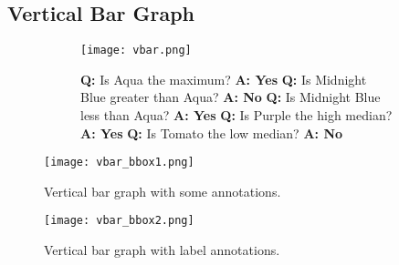 \documentclass{article} \usepackage{iclr2018_workshop,times}
\begin{document}
\subsection{Vertical Bar Graph}
\begin{figure}[h]
    \centering
    \caption{Vertical bar graph with question answer pairs.}
    \label{fig:vbar_qa}
    \begin{subfigure}[]{0.7\textwidth}
        \texttt{[image: vbar.png]}
    \end{subfigure}\begin{subfigure}[]{0.3\textwidth}
        \textbf{Q:} Is Aqua the maximum?\newline
        \textbf{A: Yes}\newline\newline
        \textbf{Q:} Is Midnight Blue greater than Aqua?\newline
        \textbf{A: No}\newline\newline
        \textbf{Q:} Is Midnight Blue less than Aqua?\newline
        \textbf{A: Yes}\newline\newline
        \textbf{Q:} Is Purple the high median?\newline
        \textbf{A: Yes}\newline\newline
        \textbf{Q:} Is Tomato the low median?\newline
        \textbf{A: No}
    \end{subfigure}
\end{figure}

\begin{SCfigure}[][h]
    \texttt{[image: vbar\_bbox1.png]}
    \caption{Vertical bar graph with some annotations.}
    \label{fig:vbar_anno}
\end{SCfigure}

\begin{SCfigure}[][h]
    \texttt{[image: vbar\_bbox2.png]}
    \caption{Vertical bar graph with label annotations.}
\end{SCfigure}

\clearpage
\end{document}
